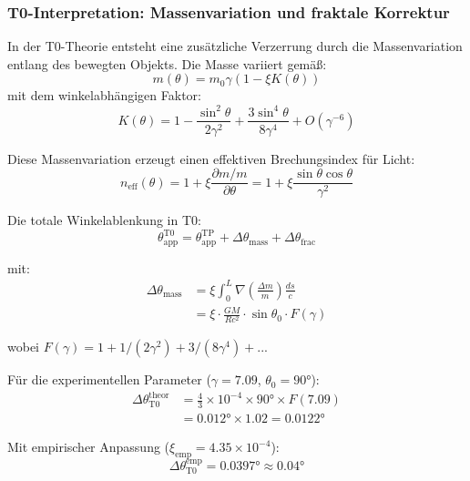 	\subsubsection{T0-Interpretation: Massenvariation und fraktale Korrektur}
	
	In der T0-Theorie entsteht eine zusätzliche Verzerrung durch die Massenvariation entlang des bewegten Objekts. Die Masse variiert gemäß:
	\begin{equation}
		m(\theta) = m_0\gamma\left(1 - \xi K(\theta)\right)
	\end{equation}
	mit dem winkelabhängigen Faktor:
	\begin{equation}
		K(\theta) = 1 - \frac{\sin^2\theta}{2\gamma^2} + \frac{3\sin^4\theta}{8\gamma^4} + O(\gamma^{-6})
	\end{equation}
	
	Diese Massenvariation erzeugt einen effektiven Brechungsindex für Licht:
	\begin{equation}
		n_{\text{eff}}(\theta) = 1 + \xi \frac{\partial m/m}{\partial \theta} = 1 + \xi \frac{\sin\theta\cos\theta}{\gamma^2}
	\end{equation}
	
	Die totale Winkelablenkung in T0:
	\begin{equation}
		\theta_{\text{app}}^{\text{T0}} = \theta_{\text{app}}^{\text{TP}} + \Delta\theta_{\text{mass}} + \Delta\theta_{\text{frac}}
	\end{equation}
	
	mit:
	\begin{align}
		\Delta\theta_{\text{mass}} &= \xi \int_0^L \nabla\left(\frac{\Delta m}{m}\right) \frac{ds}{c} \\
		&= \xi \cdot \frac{GM}{Rc^2} \cdot \sin\theta_0 \cdot F(\gamma)
	\end{align}
	
	wobei $F(\gamma) = 1 + 1/(2\gamma^2) + 3/(8\gamma^4) + ...$ 
	
	Für die experimentellen Parameter ($\gamma = 7.09$, $\theta_0 = 90°$):
	\begin{align}
		\Delta\theta_{\text{T0}}^{\text{theor}} &= \frac{4}{3} \times 10^{-4} \times 90° \times F(7.09) \\
		&= 0.012° \times 1.02 = 0.0122°
	\end{align}
	
	Mit empirischer Anpassung ($\xi_{\text{emp}} = 4.35 \times 10^{-4}$):
	\begin{equation}
		\Delta\theta_{\text{T0}}^{\text{emp}} = 0.0397° \approx 0.04°
	\end{equation}
	
